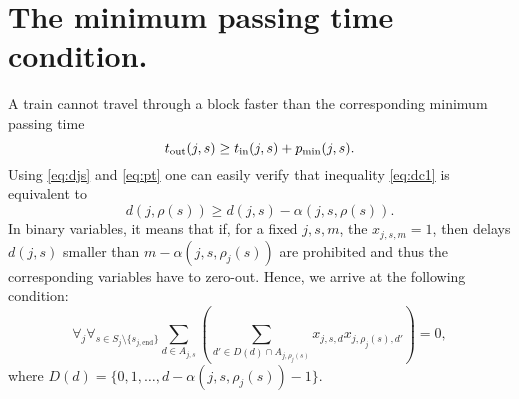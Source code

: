     \section{The minimum passing time condition.}
A train cannot travel through a block faster than the corresponding minimum
passing time
\begin{equation}
  \label{eq:dc1}
  t_\text{out}(j, s) \ge t_\text{in}(j, s) + p_\text{min}(j, s).
\end{equation}
Using \eqref{eq:djs} and \eqref{eq:pt} one can easily verify that inequality
\eqref{eq:dc1} is equivalent to
\begin{equation}
  \label{eq:passingtime}
  d(j, \rho(s)) \ge d(j, s) - \alpha(j, s, \rho(s)).
\end{equation}
In binary variables, it means that if, for a fixed $j,s,m$, the $x_{j,s,m}=1$,
then delays $d(j,s)$ smaller than $m-\alpha(j, s, \rho_j(s))$ are prohibited
and thus the corresponding variables have to zero-out. Hence, we arrive at the
following condition:
\begin{equation}
  \label{eq:qubo:passingtime}
  \forall_{j} \forall_{s \in S_j \setminus \{s_{{j,\text{end}}}\}}
  \sum_{d \in A_{j,s}}
  \left(
  \sum_{ d' \in D(d) \cap A_{j, \rho_j(s)}} x_{j, s, d}
  x_{j, \rho_j(s), d'} \right) = 0,
\end{equation}
where $D(d) = \{0, 1, \ldots, d - \alpha(j, s, \rho_j(s)) -1\}$.
